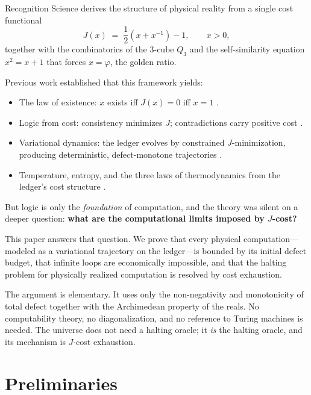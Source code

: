 \documentclass[11pt,a4paper]{article}
\theoremstyle{plain}
\theoremstyle{definition}
\theoremstyle{remark}
\newcommand{\Jcost}{J}
\begin{document}
Recognition Science derives the structure of physical reality from a single cost functional
\begin{equation}\label{eq:jcost}
\Jcost(x) \;=\; \frac{1}{2}\!\left(x + x^{-1}\right) - 1, \qquad x > 0,
\end{equation}
together with the combinatorics of the $3$-cube $Q_3$ and the self-similarity equation $x^2 = x + 1$ that forces $x = \varphi$, the golden ratio.

Previous work established that this framework yields:
\begin{itemize}[nosep]
\item The law of existence: $x$ exists iff $\Jcost(x) = 0$ iff $x = 1$ \cite{RS-LawOfExistence}.
\item Logic from cost: consistency minimizes $\Jcost$; contradictions carry positive cost \cite{RS-LogicFromCost}.
\item Variational dynamics: the ledger evolves by constrained $\Jcost$-minimization, producing deterministic, defect-monotone trajectories \cite{RS-VariationalDynamics}.
\item Temperature, entropy, and the three laws of thermodynamics from the ledger's cost structure \cite{RS-Thermodynamics}.
\end{itemize}

But logic is only the \emph{foundation} of computation, and the theory was silent on a deeper question: \textbf{what are the computational limits imposed by $\Jcost$-cost?}

This paper answers that question.
We prove that every physical computation---modeled as a variational trajectory on the ledger---is bounded by its initial defect budget, that infinite loops are economically impossible, and that the halting problem for physically realized computation is resolved by cost exhaustion.

The argument is elementary.
It uses only the non-negativity and monotonicity of total defect together with the Archimedean property of the reals.
No computability theory, no diagonalization, and no reference to Turing machines is needed.
The universe does not need a halting oracle; it \emph{is} the halting oracle, and its mechanism is $\Jcost$-cost exhaustion.

\section{Preliminaries}\label{sec:prelim}
\end{document}
